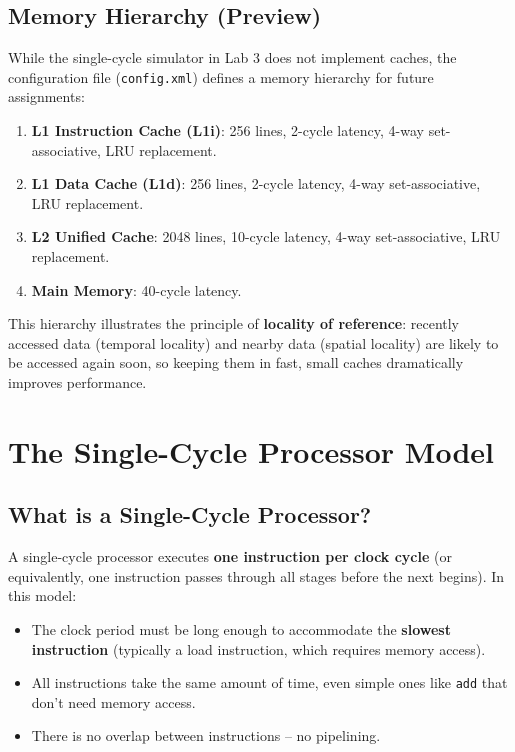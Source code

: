 \documentclass[12pt,a4paper]{article}
\begin{document}
\subsection{Memory Hierarchy (Preview)}

While the single-cycle simulator in Lab 3 does not implement caches, the configuration file (\texttt{config.xml}) defines a memory hierarchy for future assignments:

\begin{enumerate}
    \item \textbf{L1 Instruction Cache (L1i)}: 256 lines, 2-cycle latency, 4-way set-associative, LRU replacement.
    \item \textbf{L1 Data Cache (L1d)}: 256 lines, 2-cycle latency, 4-way set-associative, LRU replacement.
    \item \textbf{L2 Unified Cache}: 2048 lines, 10-cycle latency, 4-way set-associative, LRU replacement.
    \item \textbf{Main Memory}: 40-cycle latency.
\end{enumerate}

This hierarchy illustrates the principle of \textbf{locality of reference}: recently accessed data (temporal locality) and nearby data (spatial locality) are likely to be accessed again soon, so keeping them in fast, small caches dramatically improves performance.

\section{The Single-Cycle Processor Model}

\subsection{What is a Single-Cycle Processor?}

A single-cycle processor executes \textbf{one instruction per clock cycle} (or equivalently, one instruction passes through all stages before the next begins). In this model:

\begin{itemize}
    \item The clock period must be long enough to accommodate the \textbf{slowest instruction} (typically a load instruction, which requires memory access).
    \item All instructions take the same amount of time, even simple ones like \texttt{add} that don't need memory access.
    \item There is no overlap between instructions -- no pipelining.
\end{itemize}
\end{document}
